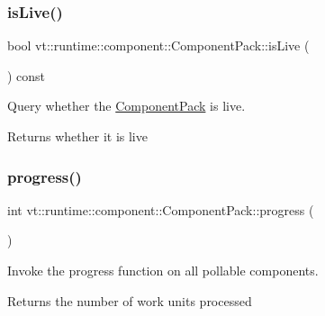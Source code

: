 \subsubsection{\texorpdfstring{is\+Live()}{isLive()}}
{\footnotesize\ttfamily bool vt\+::runtime\+::component\+::\+Component\+Pack\+::is\+Live (\begin{DoxyParamCaption}{ }\end{DoxyParamCaption}) const\hspace{0.3cm}{\ttfamily [inline]}}



Query whether the {\ttfamily \hyperlink{structvt_1_1runtime_1_1component_1_1_component_pack}{Component\+Pack}} is live. 

\begin{DoxyReturn}{Returns}
whether it is live 
\end{DoxyReturn}
\mbox{\label{structvt_1_1runtime_1_1component_1_1_component_pack_a38f85e6b4417904ea404c03fc167f5a7}} 
\subsubsection{\texorpdfstring{progress()}{progress()}}
{\footnotesize\ttfamily int vt\+::runtime\+::component\+::\+Component\+Pack\+::progress (\begin{DoxyParamCaption}{ }\end{DoxyParamCaption})}



Invoke the progress function on all pollable components. 

\begin{DoxyReturn}{Returns}
the number of work units processed 
\end{DoxyReturn}
\mbox{\label{structvt_1_1runtime_1_1component_1_1_component_pack_a956437fba91b2b90576df33276858df5}} 
